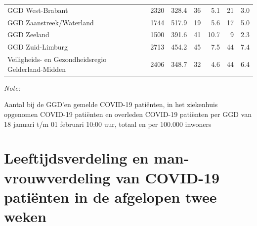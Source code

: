 \documentclass[
  english,
  man,floatsintext]{apa6}
\begin{document}
\begin{table}[H]
\begin{threeparttable}
\begin{tabular}{lrrrrrr}
GGD West-Brabant & 2320 & 328.4 & 36 & 5.1 & 21 & 3.0\\
GGD Zaanstreek/Waterland & 1744 & 517.9 & 19 & 5.6 & 17 & 5.0\\
GGD Zeeland & 1500 & 391.6 & 41 & 10.7 & 9 & 2.3\\
GGD Zuid-Limburg & 2713 & 454.2 & 45 & 7.5 & 44 & 7.4\\
Veiligheids- en Gezondheidsregio Gelderland-Midden & 2406 & 348.7 & 32 & 4.6 & 44 & 6.4\\
\bottomrule
\end{tabular}
\begin{tablenotes}
\item \textit{Note: } 
\item Aantal bij de GGD’en gemelde COVID-19 patiënten, in het ziekenhuis opgenomen COVID-19 patiënten en overleden COVID-19 patiënten per GGD van 18 januari t/m 01 februari 10:00 uur, totaal en per 100.000 inwoners
\end{tablenotes}
\end{threeparttable}
\endgroup{}
\end{table}

\newpage

\hypertarget{leeftijdsverdeling-en-man-vrouwverdeling-van-covid-19-patiuxebnten-in-de-afgelopen-twee-weken}{%
\section{Leeftijdsverdeling en man-vrouwverdeling van COVID-19 patiënten in de afgelopen twee weken}\label{leeftijdsverdeling-en-man-vrouwverdeling-van-covid-19-patiuxebnten-in-de-afgelopen-twee-weken}}
\end{document}
